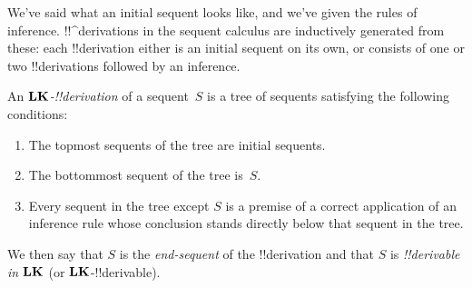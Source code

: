 \documentclass[../../../include/open-logic-section]{subfiles}
\begin{document}
      {}
      {}


\begin{explain}
We've said what an initial sequent looks like, and we've given the
rules of inference.  !!^{derivation}s in the sequent calculus are
inductively generated from these: each !!{derivation} either is an
initial sequent on its own, or consists of one or two !!{derivation}s
followed by an inference.
\end{explain}

\begin{defn}
An \emph{$\mathbf{LK}$-!!{derivation}} of a sequent~$S$ is a tree of
sequents satisfying the following conditions:
\begin{enumerate}
\item The topmost sequents of the tree are initial sequents.
\item The bottommost sequent of the tree is~$S$.
\item Every sequent in the tree except $S$ is a premise of a correct
  application of an inference rule whose conclusion stands directly
  below that sequent in the tree.
\end{enumerate}
We then say that $S$ is the \emph{end-sequent} of the !!{derivation} and
that $S$ is \emph{!!{derivable} in $\mathbf{LK}$} (or $\mathbf{LK}$-!!{derivable}).
\end{defn}
\end{document}
